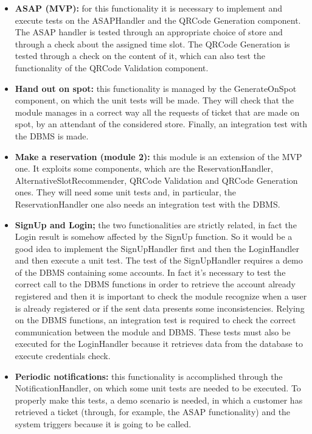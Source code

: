 \documentclass[table, 12pt]{article}
\begin{document}
\begin{itemize}
    \item \textbf{ASAP (MVP):} for this functionality it is necessary to implement and execute tests on the ASAPHandler and the QRCode Generation component. The ASAP handler is tested through an appropriate choice of store and through a check about the assigned time slot. The QRCode Generation is tested through a check on the content of it, which can also test the functionality of the QRCode Validation component.
    \item \textbf{Hand out on spot:} this functionality is managed by the GenerateOnSpot component, on which the unit tests will be made. They will check that the module manages in a correct way all the requests of ticket that are made on spot, by an attendant of the considered store. Finally, an integration test with the DBMS is made.
    \item \textbf{Make a reservation (module 2):} this module is an extension of the MVP one. It exploits some components, which are the ReservationHandler, AlternativeSlotRecommender, QRCode Validation and QRCode Generation ones. They will need some unit tests and, in particular, the ReservationHandler one also needs an integration test with the DBMS.
    \item \textbf{SignUp and Login;} the two functionalities are strictly related, in fact the Login result is somehow affected by the SignUp function. So it would be a good idea to implement the SignUpHandler first and then the LoginHandler and then execute a unit test. The test of the SignUpHandler requires a demo of the DBMS containing some accounts. In fact it’s necessary to test the correct call to the DBMS functions in order to retrieve the account already registered and then it is important to check the module recognize when a user is already registered or if the sent data presents some inconsistencies. Relying on the DBMS functions, an integration test is required to check the correct communication between the module and DBMS. These tests must also be executed for the LoginHandler because it retrieves data from the database to execute credentials check.
    \item \textbf{Periodic notifications:} this functionality is accomplished through the NotificationHandler, on which some unit tests are needed to be executed. To properly make this tests, a demo scenario is needed, in which a customer has retrieved a ticket (through, for example, the ASAP functionality) and the system triggers because it is going to be called.
\end{itemize}
\end{document}
